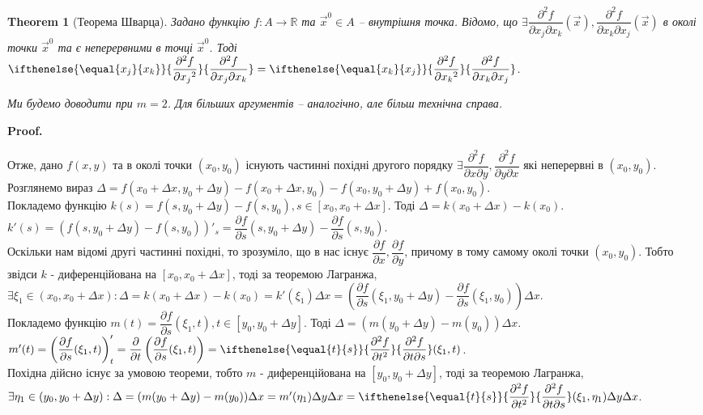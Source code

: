 \documentclass[a4paper, 10pt]{article}
\makeatletter
\def\departial#1#2{\dfrac{\partial {#1}}{\partial {#2}}}
\def\seconddepartial#1#2#3{\ifthenelse{\equal{#2}{#3}}{\dfrac{\partial^2 {#1}}{\partial {#2}^2}}{\dfrac{\partial^2 {#1}}{\partial {#2} \partial {#3}}}}
\def\qed{$\blacksquare$}
\theoremstyle{theoremdd}
\newtheorem{theorem}{Theorem}[subsection]
\theoremstyle{theoremdd}
\theoremstyle{theoremdd}
\theoremstyle{theoremdd}
\theoremstyle{theoremdd}
\theoremstyle{theoremdd}
\theoremstyle{theoremdd}
\theoremstyle{theoremdd}
\theoremstyle{theoremdd}
\renewenvironment{proof}[1][Proof.\\]{\par
\pushQED{\hfill \qed}%
\normalfont \topsep6\p@\@plus6\p@\relax
\trivlist
\item\relax
{\bfseries
#1\@addpunct{.}}\hspace\labelsep\ignorespaces
}{%
\popQED\endtrivlist\@endpefalse
}
\makeatother
\begin{document}
\begin{theorem}[Теорема Шварца]
Задано функцію $f\colon A \to \mathbb{R}$ та $\vec{x}^0 \in A$ -- внутрішня точка. Відомо, що $\exists \dfrac{\partial^2 f}{\partial x_j \partial x_k} (\vec{x}), \dfrac{\partial^2 f}{\partial x_k \partial x_j} (\vec{x})$ в околі точки $\vec{x}^0$ та є неперервними в точці $\vec{x}^0$. Тоді $\seconddepartial{f}{x_j}{x_k} = \seconddepartial{f}{x_k}{x_j}$.
\end{theorem}

\textit{Ми будемо доводити при $m = 2$. Для більших аргументів -- аналогічно, але більш технічна справа.}

\begin{proof}
Отже, дано $f(x,y)$ та в околі точки $(x_0,y_0)$ існують частинні похідні другого порядку $\exists \dfrac{\partial^2 f}{\partial x \partial y}, \dfrac{\partial^2 f}{\partial y \partial x}$ які неперервні в $(x_0,y_0)$.\\
Розглянемо вираз $\Delta = f(x_0+\Delta x, y_0+\Delta y) - f(x_0+\Delta x,y_0) - f(x_0,y_0+\Delta y) + f(x_0,y_0)$.\\
Покладемо функцію $k(s) = f(s,y_0+\Delta y) - f(s,y_0), s \in [x_0,x_0+\Delta x]$. Тоді $\Delta = k(x_0+\Delta x) - k(x_0)$.\\
$k'(s) = (f(s,y_0+\Delta y) - f(s,y_0))'_s = \departial{f}{s}(s,y_0+\Delta y) - \departial{f}{s}(s,y_0)$.\\
Оскільки нам відомі другі частинні похідні, то зрозуміло, що в нас існує $\departial{f}{x}, \departial{f}{y}$, причому в тому самому околі точки $(x_0,y_0)$. Тобто звідси $k$ - диференційована на $[x_0, x_0+\Delta x]$, тоді за теоремою Лагранжа, $\exists \xi_1 \in (x_0,x_0+\Delta x): \Delta = k(x_0+\Delta x) - k(x_0) = k'(\xi_1) \Delta x = \left( \departial{f}{s}(\xi_1,y_0+\Delta y) - \departial{f}{s}(\xi_1,y_0) \right) \Delta x$.\\
Покладемо функцію $m(t) = \departial{f}{s}(\xi_1,t), t \in [y_0,y_0+\Delta y]$. Тоді $\Delta = (m(y_0+\Delta y) - m(y_0)) \Delta x$.\\
$m'(t) = \left( \departial{f}{s}(\xi_1,t) \right)'_t = \departial{}{t}\left( \departial{f}{s}(\xi_1,t) \right) = \seconddepartial{f}{t}{s}(\xi_1,t)$.\\
Похідна дійсно існує за умовою теореми, тобто $m$ - диференційована на $[y_0,y_0+\Delta y]$, тоді за теоремою Лагранжа, $\exists \eta_1 \in (y_0,y_0+\Delta y): \Delta = (m(y_0+\Delta y)-m(y_0)) \Delta x = m'(\eta_1) \Delta y \Delta x = \seconddepartial{f}{t}{s}(\xi_1,\eta_1) \Delta y \Delta x$.
\bigskip \\

\end{proof}
\end{document}
